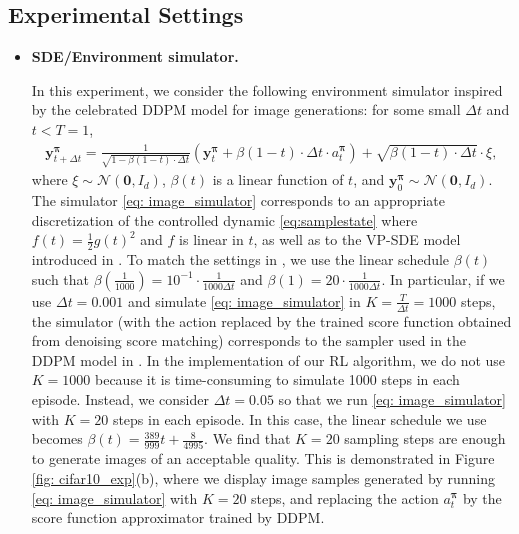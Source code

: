 \documentclass[11pt]{article}
\begin{document}
\subsection{Experimental Settings}
\begin{itemize}

\item \textbf{SDE/Environment simulator.}

In this experiment, we consider the following environment simulator inspired by the celebrated DDPM model \citep{Ho2020} for image generations: for some small $\Delta t$ and $t < T=1$,
\begin{align}\label{eq: image_simulator}
    \mathbf{y}_{t + \Delta t}^{\boldsymbol{\pi}} = \frac{1}{\sqrt{1 - \beta(1 - t)\cdot \Delta t}}\left(\mathbf{y}_{t}^{\boldsymbol{\pi}} + \beta(1 - t)\cdot\Delta t\cdot a_{t}^{\boldsymbol{\pi}}\right) + \sqrt{\beta(1 - t)\cdot\Delta t}\cdot \xi,
\end{align}
where $\xi \sim \mathcal{N}(\mathbf{0}, I_d)$, $\beta(t)$ is a linear function of $t$, and $\mathbf{y}_{0}^{\boldsymbol{\pi}}\sim \mathcal{N}(\mathbf{0}, I_d)$. The simulator \eqref{eq: image_simulator} corresponds to an appropriate discretization of the
controlled dynamic \eqref{eq:samplestate} where $f(t)= \frac{1}{2} g(t)^2$ and $f$ is linear in $t$, as well as to the VP-SDE model introduced in \cite{SongICLR2021}. To match the settings in \cite{Ho2020}, we use the linear schedule $\beta(t)$ such that $\beta(\frac{1}{1000}) = 10^{-1}\cdot \frac{1}{1000\Delta t}$ and $\beta(1) = 20 \cdot \frac{1}{1000\Delta t}$. In particular,
if we use $\Delta t = 0.001$ and simulate \eqref{eq: image_simulator} in $K= \frac{T}{\Delta t} =1000$ steps, the simulator (with the action replaced by the trained score function obtained from denoising score matching) corresponds to the sampler used in the DDPM model in \citep{Ho2020}. In the implementation of our RL algorithm, we do not use $K=1000$ because it is time-consuming to simulate 1000 steps in each episode. Instead,
we consider $\Delta t = 0.05$ so that we run \eqref{eq: image_simulator} with $K=20$ steps in each episode. In this case, the linear schedule we use becomes
$\beta(t) = \frac{389}{999}t + \frac{8}{4995}$.
We find that $K=20$ sampling steps are enough to generate images of an acceptable quality. This is demonstrated in Figure \ref{fig: cifar10_exp}(b), where we display image samples generated by running
\eqref{eq: image_simulator} with $K=20$ steps, and replacing the action $a_{t}^{\boldsymbol{\pi}}$ by the score function approximator trained by DDPM.





\end{itemize}
\end{document}
